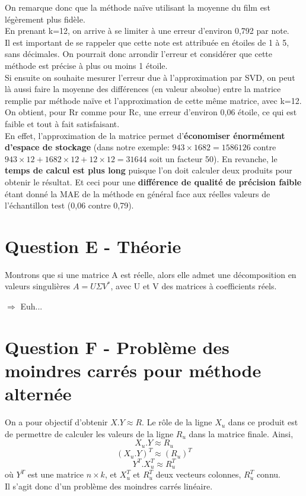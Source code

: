 \documentclass[12pt,a4paper]{article}
\begin{document}
On remarque donc que la méthode naïve utilisant la moyenne du film est légèrement plus fidèle.\\
En prenant k=12, on arrive à se limiter à une erreur d'environ 0,792 par note.\\
Il est important de se rappeler que cette note est attribuée en étoiles de 1 à 5, sans décimales. On pourrait donc arrondir l'erreur et considérer que cette méthode est précise à plus ou moins 1 étoile.\\

Si ensuite on souhaite mesurer l'erreur due à l'approximation par SVD, on peut là aussi faire la moyenne des différences (en valeur absolue) entre la matrice remplie par méthode naïve et l'approximation de cette même matrice, avec k=12.\\
On obtient, pour Rr comme pour Rc, une erreur d'environ 0,06 étoile, ce qui est faible et tout à fait satisfaisant.\\

En effet, l'approximation de la matrice permet d'\textbf{économiser énormément d'espace de stockage} (dans notre exemple: $943\times1682=1586126$ contre $943\times12+1682\times12+12\times12=31644$ soit un facteur 50). En revanche, le \textbf{temps de calcul est plus long} puisque l'on doit calculer deux produits pour obtenir le résultat. Et ceci pour une \textbf{différence de qualité de précision faible} étant donné la MAE de la méthode en général face aux réelles valeurs de l'échantillon test (0,06 contre 0,79).

\section{Question E - Théorie}
Montrons que si une matrice A est réelle, alors elle admet une décomposition en valeurs singulières $A=U \Sigma V^{*}$, avec U et V des matrices à coefficients réels.

$\Rightarrow$ Euh...

\section{Question F - Problème des moindres carrés pour méthode alternée}
On a pour objectif d'obtenir $X.Y\approx R$. Le rôle de la ligne $X_u$ dans ce produit est de permettre de calculer les valeurs de la ligne $R_u$ dans la matrice finale. Ainsi, 
$$X_u.Y\approx R_u$$
$$(X_u.Y)^T\approx (R_u)^T$$
$$Y^T.X_u^T\approx R_u^T$$
où $Y^T$ est une matrice $n\times k$, et $X_u^T$ et $R_u^T$ deux vecteurs colonnes, $R_u^T$ connu. \\
Il s'agit donc d'un problème des moindres carrés linéaire.\\
\end{document}
